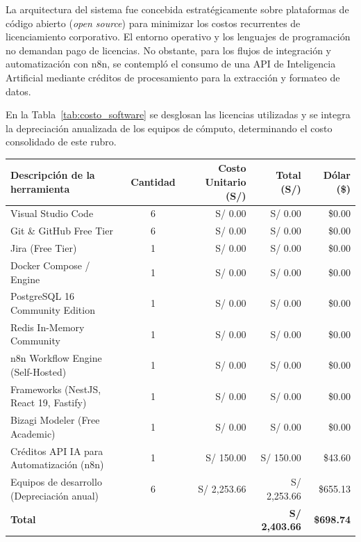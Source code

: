 La arquitectura del sistema fue concebida estratégicamente sobre plataformas de código abierto (\textit{open source})
 para minimizar los costos recurrentes de licenciamiento corporativo. El entorno operativo y los lenguajes de programación no demandan pago de licencias. 
 No obstante, para los flujos de integración y automatización con n8n, 
 se contempló el consumo de una API de Inteligencia Artificial mediante créditos de procesamiento para la extracción y formateo de datos.

En la Tabla~\ref{tab:costo_software} se desglosan las licencias utilizadas y se integra la depreciación anualizada de los equipos de cómputo, determinando el costo consolidado de este rubro.

\par
\noindent
\begin{minipage}{\linewidth}

    \begingroup
    \renewcommand{\baselinestretch}{1}
    \footnotesize
    \setlength{\tabcolsep}{4pt}
    \renewcommand{\arraystretch}{1.25}

    \begin{tabularx}{\linewidth}{@{}p{5.2cm}c r r r@{}}
        \toprule
        \textbf{Descripción de la herramienta} & \textbf{Cantidad} & \textbf{Costo Unitario (S/)} & \textbf{Total (S/)} & \textbf{Dólar (\$)} \\ \midrule
        Visual Studio Code & 6 & S/ 0.00 & S/ 0.00 & \$0.00 \\ 
        Git \& GitHub Free Tier & 6 & S/ 0.00 & S/ 0.00 & \$0.00 \\ 
        Jira (Free Tier) & 1 & S/ 0.00 & S/ 0.00 & \$0.00 \\ 
        Docker Compose / Engine & 1 & S/ 0.00 & S/ 0.00 & \$0.00 \\ 
        PostgreSQL 16 Community Edition & 1 & S/ 0.00 & S/ 0.00 & \$0.00 \\ 
        Redis In-Memory Community & 1 & S/ 0.00 & S/ 0.00 & \$0.00 \\ 
        n8n Workflow Engine (Self-Hosted) & 1 & S/ 0.00 & S/ 0.00 & \$0.00 \\ 
        Frameworks (NestJS, React 19, Fastify) & 1 & S/ 0.00 & S/ 0.00 & \$0.00 \\ 
        Bizagi Modeler (Free Academic) & 1 & S/ 0.00 & S/ 0.00 & \$0.00 \\ 
        Créditos API IA para Automatización (n8n) & 1 & S/ 150.00 & S/ 150.00 & \$43.60 \\ 
        Equipos de desarrollo (Depreciación anual) & 6 & S/ 2,253.66 & S/ 2,253.66 & \$655.13 \\ \midrule
        \textbf{Total} & & & \textbf{S/ 2,403.66} & \textbf{\$698.74} \\ \bottomrule
    \end{tabularx}
    \endgroup

\end{minipage}
\finBloqueAPA